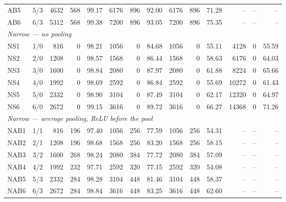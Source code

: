 \begin{table}[t]
\begin{tabular}{llrrrrrrrrrrrr}
AB5 & 5/3 & 4632 & 568 & 99.17 & 6176 & 896 & 92.00 & 6176 & 896 & 71.28 & -- & -- & -- \\
AB6 & 6/3 & 5312 & 568 & 99.38 & 7200 & 896 & 93.05 & 7200 & 896 & 75.35 & -- & -- & -- \\
\midrule
\multicolumn{14}{l}{\textit{Narrow --- no pooling}} \\
NS1 & 1/0 & 816 & 0 & 98.21 & 1056 & 0 & 84.68 & 1056 & 0 & 55.11 & 4128 & 0 & 55.59 \\
NS2 & 2/0 & 1208 & 0 & 98.57 & 1568 & 0 & 86.44 & 1568 & 0 & 58.63 & 6176 & 0 & 64.03 \\
NS3 & 3/0 & 1600 & 0 & 98.84 & 2080 & 0 & 87.97 & 2080 & 0 & 61.88 & 8224 & 0 & 65.66 \\
NS4 & 4/0 & 1992 & 0 & 98.69 & 2592 & 0 & 86.84 & 2592 & 0 & 55.69 & 10272 & 0 & 61.43 \\
NS5 & 5/0 & 2332 & 0 & 98.90 & 3104 & 0 & 87.49 & 3104 & 0 & 62.17 & 12320 & 0 & 64.97 \\
NS6 & 6/0 & 2672 & 0 & 99.15 & 3616 & 0 & 89.72 & 3616 & 0 & 66.27 & 14368 & 0 & 71.26 \\
\midrule
\multicolumn{14}{l}{\textit{Narrow --- average pooling, ReLU before the pool}} \\
NAB1 & 1/1 & 816 & 196 & 97.40 & 1056 & 256 & 77.59 & 1056 & 256 & 54.31 & -- & -- & -- \\
NAB2 & 2/1 & 1208 & 196 & 98.68 & 1568 & 256 & 83.20 & 1568 & 256 & 58.15 & -- & -- & -- \\
NAB3 & 3/2 & 1600 & 268 & 98.24 & 2080 & 384 & 77.72 & 2080 & 384 & 57.09 & -- & -- & -- \\
NAB4 & 4/2 & 1992 & 232 & 97.71 & 2592 & 320 & 77.15 & 2592 & 320 & 54.08 & -- & -- & -- \\
NAB5 & 5/3 & 2332 & 284 & 98.28 & 3104 & 448 & 81.46 & 3104 & 448 & 58.37 & -- & -- & -- \\
NAB6 & 6/3 & 2672 & 284 & 98.84 & 3616 & 448 & 83.25 & 3616 & 448 & 62.60 & -- & -- & -- \\
\bottomrule
\end{tabular}
\end{table}
